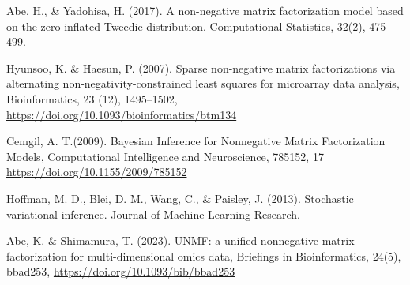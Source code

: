 \documentclass[a4paper,12pt]{jsarticle} %
\numberwithin{equation}{section} %
\begin{document}
\begin{thebibliography}{9}
\item{} Abe, H., \& Yadohisa, H. (2017). A non-negative matrix factorization model based on the zero-inflated Tweedie distribution. Computational Statistics, 32(2), 475-499.
\item{}Hyunsoo, K. \&  Haesun, P. (2007). Sparse non-negative matrix factorizations via alternating non-negativity-constrained least squares for microarray data analysis, Bioinformatics,  23 (12), 1495--1502, \url{https://doi.org/10.1093/bioinformatics/btm134}
\item{} Cemgil, A. T.(2009). Bayesian Inference for Nonnegative Matrix Factorization Models, Computational Intelligence and Neuroscience, 785152, 17 \url{https://doi.org/10.1155/2009/785152}
\item{} Hoffman, M. D., Blei, D. M., Wang, C., \& Paisley, J. (2013). Stochastic variational inference. Journal of Machine Learning Research.
\item{} Abe, K. \& Shimamura, T. (2023). UNMF: a unified nonnegative matrix factorization for multi-dimensional omics data, Briefings in Bioinformatics, 24(5), bbad253, \url{https://doi.org/10.1093/bib/bbad253}
\end{thebibliography}
\end{document}
